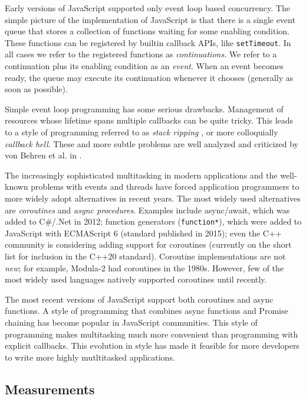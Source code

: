 \documentclass[acmsmall,anonymous,review]{acmart}\settopmatter{printfolios=true,printccs=false,printacmref=false}
\begin{document}
Early versions of JavaScript supported only event loop based concurrency.
The simple picture of the implementation of JavaScript is that there is a single event queue that stores a collection of functions waiting for some enabling condition.
These functions can be registered by builtin callback APIs, like \texttt{setTimeout}.
In all cases we refer to the registered functions as \emph{continuations}.
We refer to a continuation plus its enabling condition as an \emph{event}.
When an event becomes ready, the queue may execute its continuation whenever it chooses (generally as soon as possible).

Simple event loop programming has some serious drawbacks.
Management of resources whose lifetime spans multiple callbacks can be quite tricky.
This leads to a style of programming referred to as \emph{stack ripping} \cite{Adya2002}, or more colloquially \emph{callback hell}.
These and more subtle problems are well analyzed and criticized by von Behren et al. in \cite{Behren2003a}.

The increasingly sophisticated multitasking in modern applications and the well-known problems with events and threads have forced application programmers to more widely adopt alternatives in recent years.
The most widely used alternatives are \emph{coroutines} and \emph{async procedures}.
Examples include async/await, which was added to C\#/.Net in 2012; function generators (\texttt{function*}), which were added to JavaScript with ECMAScript 6 (standard published in 2015); even the C++ community is considering adding support for coroutines (currently on the short list for inclusion in the C++20 standard).
Coroutine implementations are not \emph{new}; for example, Modula-2 had coroutines in the 1980s.
However, few of the most widely used languages natively supported coroutines until recently.

The most recent versions of JavaScript support both coroutines and async functions.
A style of programming that combines async functions and Promise chaining has become popular in JavaScript communities.
This style of programming makes multitasking much more convenient than programming with explicit callbacks.
This evolution in style has made it feasible for more developers to write more highly mutltitasked applications.

\subsection{Measurements}
\end{document}
